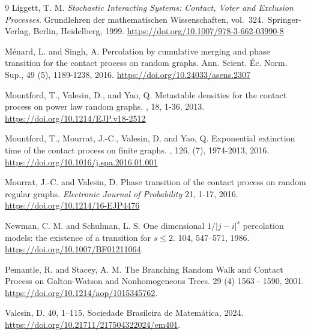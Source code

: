 \documentclass[a4paper,oneside,12pt]{amsart}
\renewcommand{\leq}{\leqslant}
\theoremstyle{plain}
\theoremstyle{definition}
\theoremstyle{remark}
\begin{document}
\begin{thebibliography}{9}
Liggett, T. M. 
\newblock \emph{Stochastic Interacting Systems: Contact, Voter and Exclusion Processes}. Grundlehren der mathematischen Wissenschaften, vol.\ 324.\ Springer-Verlag, Berlin, Heidelberg, 1999. 
\newblock \url{https://doi.org/10.1007/978-3-662-03990-8}

Ménard, L. and Singh, A. 
\newblock Percolation by cumulative merging and phase transition for the contact process on random graphs. 
\newblock Ann. Scient. Éc. Norm. Sup., 49 (5), 1189-1238, 2016.
\newblock \url{https://doi.org/10.24033/asens.2307}

Mountford, T., Valesin, D., and Yao, Q. 
\newblock Metastable densities for the contact process on power law random graphs.
, 18, 1-36, 2013. 
\newblock \url{https://doi.org/10.1214/EJP.v18-2512}

Mountford, T., Mourrat, J.-C., Valesin, D. and Yao, Q. 
\newblock Exponential extinction time of the contact process on finite graphs. 
, 126, (7), 1974-2013, 2016. 
\newblock \url{https://doi.org/10.1016/j.spa.2016.01.001}

Mourrat, J.-C. and Valesin, D. 
\newblock  Phase transition of the contact process on random regular graphs. \newblock \emph{Electronic Journal of Probability} 21, 1-17, 2016.
\newblock \url{https://doi.org/10.1214/16-EJP4476}

Newman, C. M. and  Schulman, L. S. 
\newblock One dimensional ${1}/{|j-i|^s}$ percolation models: the existence of a transition for $s \leq 2$. 
 104, 547–571, 1986.
\newblock \url{https://doi.org/10.1007/BF01211064}.

 Pemantle, R. and Stacey, A. M.
 \newblock The Branching Random Walk and Contact Process on Galton-Watson and Nonhomogeneous Trees. 
  29 (4) 1563 - 1590, 2001. 
 \newblock \url{https://doi.org/10.1214/aop/1015345762}.

 Valesin, D. 
   40, 1–115,
 Sociedade Brasileira de Matemática, 2024.
\newblock \url{https://doi.org/10.21711/217504322024/em401}.


 
\end{thebibliography}
\end{document}
